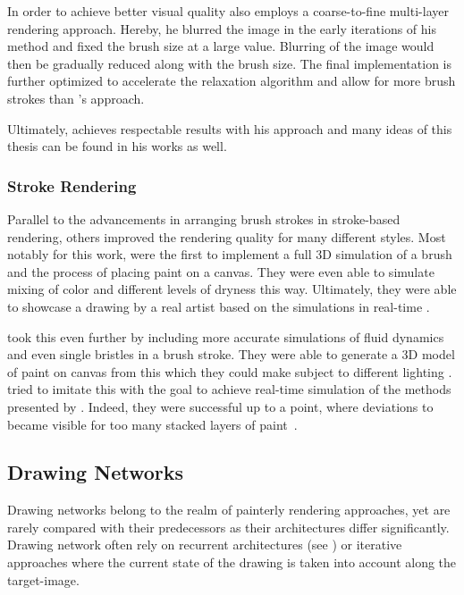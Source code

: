 In order to achieve better visual quality \citeauthor*{Hertzmann} also employs a coarse-to-fine multi-layer rendering approach.
Hereby, he blurred the image in the early iterations of his method and fixed the brush size at a large value.
Blurring of the image would then be gradually reduced along with the brush size.
The final implementation is further optimized to accelerate the relaxation algorithm and allow for more brush strokes than \citeauthor*{paintbynumbers}'s approach.

Ultimately, \citeauthor*{Hertzmann} achieves respectable results with his approach and many ideas of this thesis can be found in his works as well.

\subsubsection{Stroke Rendering}
Parallel to the advancements in arranging brush strokes in stroke-based rendering, others improved the rendering quality for many different styles.
Most notably for this work, \citeauthor*{baxter} were the first to implement a full 3D simulation of a brush and the process of placing paint on a canvas.
They were even able to simulate mixing of color and different levels of dryness this way.
Ultimately, they were able to showcase a drawing by a real artist based on the simulations in real-time \cite{baxter}.

\citeauthor*{wetbrush} took this even further by including more accurate simulations of fluid dynamics and even single bristles in a brush stroke.
They were able to generate a 3D model of paint on canvas from this which they could make subject to different lighting \cite{wetbrush}.
\citeauthor*{adobe} tried to imitate this with the goal to achieve real-time simulation of the methods presented by \citeauthor*{wetbrush}.
Indeed, they were successful up to a point, where deviations to \cite{wetbrush} became visible for too many stacked layers of paint~\cite{adobe}.


\subsection{Drawing Networks}
Drawing networks belong to the realm of painterly rendering approaches, yet are rarely compared with their predecessors as their architectures differ significantly.
Drawing network often rely on recurrent architectures (see ) or iterative approaches where the current state of the drawing is taken into account along the target-image.

